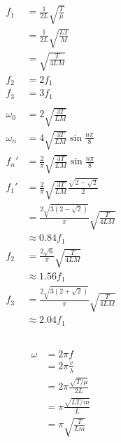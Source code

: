 \documentclass{article}
\begin{document}
\begin{align*}
  f_1      & = \frac{1}{2 L} \sqrt{\frac{T}{\mu}}                                 \\
           & = \frac{1}{2 L} \sqrt{\frac{L T}{M}}                                 \\
           & = \sqrt{\frac{T}{4 L M}}                                             \\
  f_2      & = 2 f_1                                                              \\
  f_3      & = 3 f_1                                                              \\ \\
  \omega_0 & = 2 \sqrt{\frac{3 T}{L M}}                                           \\
  \omega_n & = 4 \sqrt{\frac{3 T}{L M}} \sin \frac{n \pi}{8}                      \\
  f_n'     & = \frac{2}{\pi} \sqrt{\frac{3 T}{L M}} \sin \frac{n \pi}{8}          \\
  f_1'     & = \frac{2}{\pi} \sqrt{\frac{3 T}{L M}} \frac{\sqrt{2 - \sqrt{2}}}{2} \\
           & = \frac{2 \sqrt{3 (2 - \sqrt{2})}}{\pi} \sqrt{\frac{T}{4 L M}}       \\
           & \approx 0.84 f_1                                                     \\
  f_2      & = \frac{2 \sqrt{6}}{\pi} \sqrt{\frac{T}{4 L M}}                      \\
           & \approx 1.56 f_1                                                     \\
  f_3      & = \frac{2 \sqrt{3 (2 + \sqrt{2})}}{\pi} \sqrt{\frac{T}{4 L M}}       \\
           & \approx 2.04 f_1
\end{align*}

\setcounter{subsection}{4}
\subsection{}

\begin{align*}
  \omega & = 2 \pi f                          \\
         & = 2 \pi \frac{v}{\lambda}          \\
         & = 2 \pi \frac{\sqrt{T / \mu}}{2 L} \\
         & = \pi \frac{\sqrt{L T / m}}{L}     \\
         & = \pi \sqrt{\frac{T}{L m}}
\end{align*}
\end{document}
